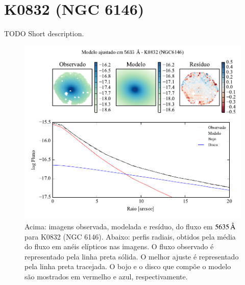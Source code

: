 
\section{K0832 (NGC 6146)}
\label{apendice:Decomp:K0832}

TODO Short description.

\begin{figure}
	\includegraphics[page=1]{figuras-decomp/K0832_sample006a}
	\caption[Ajuste morfológico em $5635\,\angstrom$ de K0832 (NGC 6146)]
	{Acima: imagens observada, modelada e resíduo, do fluxo em $5635\,\angstrom$
	para K0832 (NGC 6146). Abaixo: perfis radiais, obtidos pela média do fluxo em
	anéis elípticos nas imagens. O fluxo observado é representado pela linha preta
	sólida. O melhor ajuste é representado pela linha preta tracejada. O bojo e o
	disco que compõe o modelo são mostrados em vermelho e azul, respectivamente.}
	\label{fig:decompRadprof:K0832}
\end{figure}

